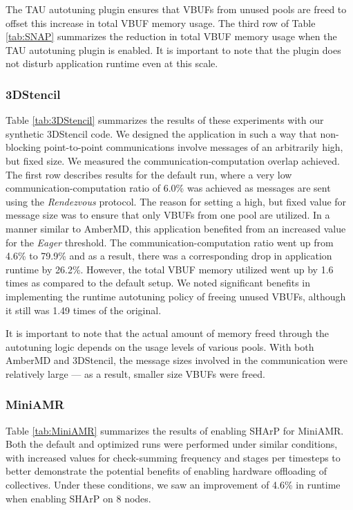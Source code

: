 The TAU autotuning plugin ensures that VBUFs from unused pools are freed to offset this increase in total VBUF memory usage. The third row of Table \ref{tab:SNAP} summarizes the reduction in total VBUF memory usage when the TAU autotuning plugin is enabled. It is important to note that the plugin does not disturb application runtime even at this scale.

\subsubsection{3DStencil}
Table \ref{tab:3DStencil} summarizes the results of these experiments with our synthetic 3DStencil code. We designed the application in such a way that non-blocking point-to-point communications involve messages of an arbitrarily high, but fixed size. We measured the communication-computation overlap achieved. The first row describes results for the default run, where a very low communication-computation ratio of 6.0\% was achieved as messages are sent using the \emph{Rendezvous} protocol. The reason for setting a high, but fixed value for message size was to ensure that only VBUFs from one pool are utilized. In a manner similar to AmberMD, this application benefited from an increased value for the \emph{Eager} threshold. The communication-computation ratio went up from 4.6\% to 79.9\% and as a result, there was a corresponding drop in application runtime by 26.2\%. However, the total VBUF memory utilized went up by 1.6 times as compared to the default setup. We noted significant benefits in implementing the runtime autotuning policy of freeing unused VBUFs, although it still was 1.49 times of the original. \par

It is important to note that the actual amount of memory freed through the autotuning logic depends on the usage levels of various pools. With both AmberMD and 3DStencil, the message sizes involved in the communication were relatively large --- as a result, smaller size VBUFs were freed.

\subsubsection{MiniAMR}
Table \ref{tab:MiniAMR} summarizes the results of enabling SHArP for MiniAMR. Both the default and optimized runs were performed under similar conditions, with increased values for check-summing frequency and stages per timesteps to better demonstrate the potential benefits of enabling hardware offloading of collectives. Under these conditions, we saw an improvement of 4.6\% in runtime when enabling SHArP on 8 nodes. 

